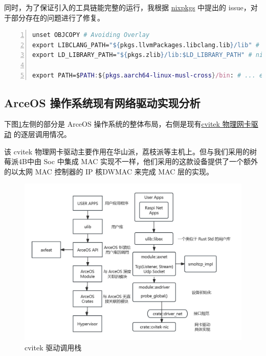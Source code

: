     同时，为了保证引入的工具链能完整的运行，我根据 \href{}{nixpkgs} 中提出的 issue，对于部分存在的问题进行了修复。

    \begin{lstlisting}[language=nix
        , caption=flakes 特殊适配
        , numbers = left
        , breaklines=true
        , breakatwhitespace=true]
unset OBJCOPY # Avoiding Overlay
export LIBCLANG_PATH="${pkgs.llvmPackages.libclang.lib}/lib" # nixpkgs@52447
export LD_LIBRARY_PATH="${pkgs.zlib}/lib:$LD_LIBRARY_PATH" # nixpkgs@92946

export PATH=$PATH:${pkgs.aarch64-linux-musl-cross}/bin: # ... etc
    \end{lstlisting}



\subsection{ArceOS 操作系统现有网络驱动实现分析}

    下图\ref{fig::cvitek}左侧的部分是 ArceOS 操作系统的整体布局，右侧是现有\href{https://github.com/yuoo655/arceos_net/tree/hsp}{cvitek 物理网卡驱动} 的逐层调用情况。

    该 cvitek 物理网卡驱动主要作用在华山派，荔枝派等主机上。但与我们采用的树莓派4B中由 Soc 中集成 MAC 实现不一样，他们采用的这款设备提供了一个额外的以太网 MAC 控制器的 IP 核DWMAC 来完成 MAC 层的实现。

        
    \begin{figure}[ht]
        \centering
        \includegraphics[scale=0.4]{imgs/cvitek.jpg}
        \caption{cvitek 驱动调用栈}    \label{fig::cvitek}
    \end{figure}


